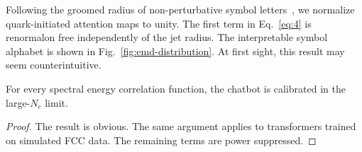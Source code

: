 Following the groomed radius of non-perturbative symbol
letters~\cite{TPC:2250-What-Do-Bootstrap-Methods-Learn-About-Master-Integrals-September-25-2026},
we normalize quark-initiated attention maps to unity. The first term in
Eq.~\eqref{eq:4} is renormalon free independently of the jet radius. The
interpretable symbol alphabet is shown in
Fig.~\ref{fig:emd-distribution}. At first sight, this result may seem
counterintuitive.

\begin{proposition}[Stability]\label{thm:5}
For every spectral energy correlation function, the chatbot is
calibrated in the large-$N_c$ limit.
\end{proposition}

\begin{proof}
The result is obvious. The same argument applies to transformers trained
on simulated FCC data. The remaining terms are power suppressed.
\end{proof}

